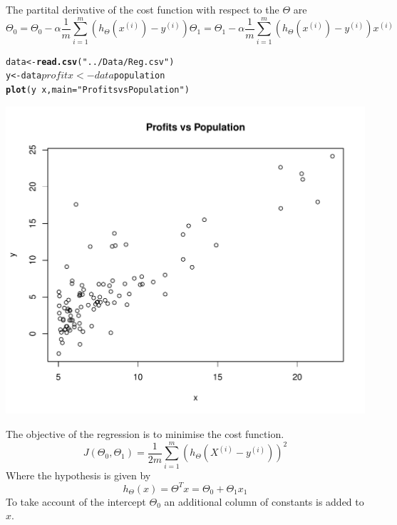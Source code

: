\documentclass[12pt, a4paper, oneside]{article}\usepackage[]{graphicx}\usepackage[]{color}
\makeatletter
\def\maxwidth{ %
  \ifdim\Gin@nat@width>\linewidth
    \linewidth
  \else
    \Gin@nat@width
  \fi
}
\newcommand{\hlstr}[1]{\textcolor[rgb]{0.192,0.494,0.8}{#1}}%
\newcommand{\hlkwd}[1]{\textcolor[rgb]{0.737,0.353,0.396}{\textbf{#1}}}%
\newenvironment{kframe}{%
 \def\at@end@of@kframe{}%
 \ifinner\ifhmode%
  \def\at@end@of@kframe{\end{minipage}}%
  \begin{minipage}{\columnwidth}%
 \fi\fi%
 \def\FrameCommand##1{\hskip\@totalleftmargin \hskip-\fboxsep
 \colorbox{shadecolor}{##1}\hskip-\fboxsep
     \hskip-\linewidth \hskip-\@totalleftmargin \hskip\columnwidth}%
 \MakeFramed {\advance\hsize-\width
   \@totalleftmargin\z@ \linewidth\hsize
   \@setminipage}}%
 {\par\unskip\endMakeFramed%
 \at@end@of@kframe}
\newenvironment{knitrout}{}{} %
\makeatother
\begin{document}
The partital derivative of the cost function with respect to the $\Theta$ are
\begin{subequations}
\begin{equation}
\Theta_0 = \Theta_0 - \alpha \frac{1}{m}\sum_{i=1}^m (h_{\Theta}(x^{(i)}) - y^{(i)})
\end{equation}
\begin{equation}
\Theta_1 = \Theta_1 - \alpha \frac{1}{m}\sum_{i=1}^m (h_{\Theta}(x^{(i)}) - y^{(i)})x^{(i)}
\end{equation}
\end{subequations}

\begin{knitrout}
\color{fgcolor}\begin{kframe}
\begin{alltt}
data <- \hlkwd{read.csv}(\hlstr{"../Data/Reg.csv"})
y <- data$profit
x <- data$population
\hlkwd{plot}(y ~ x, main = \hlstr{"Profits vs Population"})
\end{alltt}
\end{kframe}
\includegraphics[width=\maxwidth]{figure/Regression} 

\end{knitrout}

The objective of the regression is to minimise the cost function.
\begin{equation}
J(\Theta_0, \Theta_1) = \frac{1}{2m} \sum_{i=1}^m (h_{\Theta}(X^{(i)} - y^{(i)}))^2
\end{equation}
Where the hypothesis is given by 
\begin{equation}
h_{\Theta}(x) = \Theta^Tx = \Theta_0 + \Theta_1x_1
\end{equation}
To take account of the intercept $\Theta_0$ an additional column of constants is added to $x$. 
\end{document}
